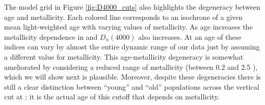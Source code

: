 

The model grid in Figure \ref{fig:D4000_cuts} also highlights the
degeneracy between age and metallicity. Each colored line corresponds
to an isochrone of a given mean light-weighted age with varying values
of metallicity. As age increases the metallicity dependence in \Hda
and $D_n(4000)$ also increases. At an age of  these
indices can vary by almost the entire dynamic range of our data just
by assuming a different value for metallicity.  This age-metallicity
degeneracy is somewhat ameliorated by considering a reduced range of
metallicity (between 0.2 and 2.5 \Zsol), which we will show next is
plausible. Moreover, despite these degeneracies there is still a clear
distinction between ``young'' and ``old'' populations across the
vertical cut at ; it is the actual age of this cutoff
that depends on metallicity.


